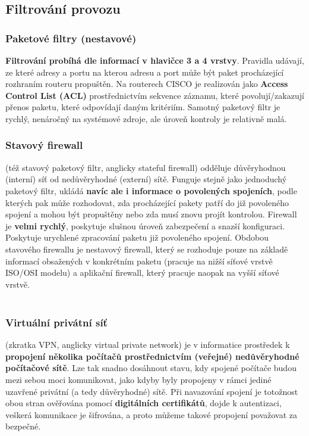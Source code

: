 \subsection*{Filtrování provozu}
\subsubsection*{Paketové filtry (nestavové)}
\textbf{Filtrování probíhá dle informací v hlavičce 3 a 4 vrstvy}. Pravidla udávají, ze které adresy a portu na kterou adresu a port může být paket procházející rozhraním routeru propuštěn. Na routerech CISCO je realizován jako \textbf{Access Control List (ACL)} prostřednictvím sekvence záznamu, které povolují/zakazují přenos paketu, které odpovídají daným kritériím. Samotný paketový filtr je rychlý, nenáročný na systémové zdroje, ale úroveň kontroly je relativně malá.

\subsubsection*{Stavový firewall}
(též stavový paketový filtr, anglicky stateful firewall) odděluje důvěryhodnou (interní) síť od nedůvěryhodné (externí) sítě. Funguje stejně jako jednoduchý paketový filtr, ukládá \textbf{navíc ale i informace o povolených spojeních}, podle kterých pak může rozhodovat, zda procházející pakety patří do již povoleného spojení a mohou být propuštěny nebo zda musí znovu projít kontrolou. Firewall je \textbf{velmi rychlý}, poskytuje slušnou úroveň zabezpečení a snazší konfiguraci.  Poskytuje urychlené zpracování paketu již povoleného spojení. Obdobou stavového firewallu je nestavový firewall, který se rozhoduje pouze na základě informací obsažených v konkrétním paketu (pracuje na nižší síťové vrstvě ISO/OSI modelu) a aplikační firewall, který pracuje naopak na vyšší síťové vrstvě. 
\\\\
\noindent{}

\subsubsection*{Virtuální privátní síť }
(zkratka VPN, anglicky virtual private network) je v informatice prostředek k \textbf{propojení několika počítačů prostřednictvím (veřejné) nedůvěryhodné počítačové sítě}. Lze tak snadno dosáhnout stavu, kdy spojené počítače budou mezi sebou moci komunikovat, jako kdyby byly propojeny v rámci jediné uzavřené privátní (a tedy důvěryhodné) sítě. Při navazování spojení je totožnost obou stran ověřována pomocí \textbf{digitálních certifikátů}, dojde k autentizaci, veškerá komunikace je šifrována, a proto můžeme takové propojení považovat za bezpečné.

